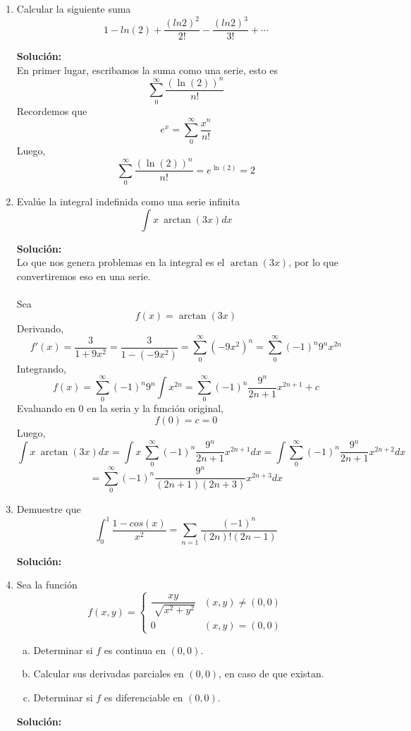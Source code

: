 \documentclass[12pt]{article}
\newenvironment{solucion}
{\begin{mdframed}[backgroundcolor=black!10]
		{\bf Solución:}\\
	}
	{
	\end{mdframed}
}
\newenvironment{preguntas}
{\begin{enumerate}\itemsep12pt
	}
	{
	\end{enumerate}
}
\begin{document}
\begin{preguntas}
\item Calcular la siguiente suma
	$$1 - ln(2) + \dfrac{(ln2)^2}{2!}-\dfrac{(ln2)^3}{3!}+\cdots$$
\begin{solucion}
En primer lugar, escribamos la suma como una serie, esto es
$$\sum\limits_{0}^{\infty} \dfrac{(\ln(2))^n}{n!}$$
Recordemos que
$$e^x = \sum\limits_{0}^{\infty} \dfrac{x^n}{n!}$$
Luego,
$$\sum\limits_{0}^{\infty} \dfrac{(\ln(2))^n}{n!} = e^{\ln(2)} = 2$$
\end{solucion}
\item Evalúe la integral indefinida como una serie infinita
	$$\int x\ \arctan(3x)dx$$
\begin{solucion}
Lo que nos genera problemas en la integral es el $\arctan(3x)$, por lo que convertiremos eso en una serie.\\
\\
Sea
$$f(x) = \arctan(3x)$$
Derivando,
$$f'(x) = \dfrac{3}{1+9x^2} = \dfrac{3}{1-(-9x^2)} = \sum\limits_0^{\infty}(-9x^2)^n = \sum\limits_0^{\infty}(-1)^n 9^n x^{2n}$$
Integrando,
$$f(x) = \sum\limits_0^{\infty}(-1)^n 9^n \int x^{2n} = \sum\limits_0^{\infty}(-1)^n \dfrac{9^n}{2n+1}x^{2n+1} + c$$
Evaluando en 0 en la seria y la función original,
$$f(0) = c = 0$$
Luego,
$$\int x\ \arctan(3x)dx
= \int x\ \sum\limits_0^{\infty}(-1)^n \dfrac{9^n}{2n+1}x^{2n+1}dx
= \int \sum\limits_0^{\infty}(-1)^n \dfrac{9^n}{2n+1}x^{2n+2}dx
$$
$$
= \sum\limits_0^{\infty}(-1)^n \dfrac{9^n}{(2n+1)(2n+3)}x^{2n+3}dx
$$
\end{solucion}
\item Demuestre que
$$\int_0^1 \dfrac{1-cos(x)}{x^2} = \sum\limits_{n=1} \dfrac{(-1)^n}{(2n)!(2n-1)} $$
\begin{solucion}

\end{solucion}
\item Sea la función
	$$f(x,y)=
	\begin{cases}
	\dfrac{xy}{\sqrt[]{x^2+y^2}} & (x,y) \neq (0,0)\\
	0 & (x,y)=(0,0)
	\end{cases}
	$$
\begin{enumerate}[a)]
\item Determinar si $f$ es continua en $(0,0)$.
\item Calcular sus derivadas parciales en $(0,0)$, en caso de que existan.
\item Determinar si $f$ es diferenciable en $(0,0)$.
\end{enumerate}
\begin{solucion}


\end{solucion}
\end{preguntas}
\end{document}
